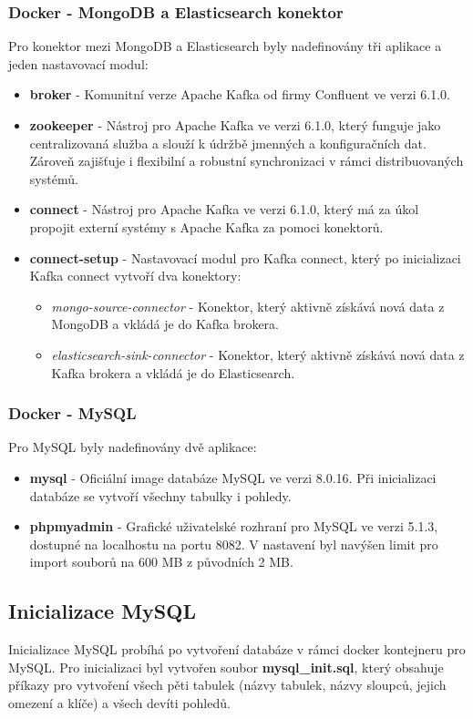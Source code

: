 \subsubsection{Docker - MongoDB a Elasticsearch konektor}
Pro konektor mezi MongoDB a Elasticsearch byly nadefinovány tři aplikace a jeden nastavovací modul:
\begin{itemize}
\item \textbf{broker} - Komunitní verze Apache Kafka od firmy Confluent ve verzi 6.1.0.
\item \textbf{zookeeper} - Nástroj pro Apache Kafka ve verzi 6.1.0, který funguje jako centralizovaná služba a slouží k údržbě jmenných a konfiguračních dat. Zároveň zajišťuje i flexibilní a robustní synchronizaci v rámci distribuovaných systémů.
\item \textbf{connect} - Nástroj pro Apache Kafka ve verzi 6.1.0, který má za úkol propojit externí systémy s Apache Kafka za pomoci konektorů.
\item \textbf{connect-setup} - Nastavovací modul pro Kafka connect, který po inicializaci Kafka connect vytvoří dva konektory:
	\begin{itemize}
	\item \textit{mongo-source-connector} - Konektor, který aktivně získává nová data z MongoDB a vkládá je do Kafka brokera.
	\item \textit{elasticsearch-sink-connector} - Konektor, který aktivně získává nová data z Kafka brokera a vkládá je do Elasticsearch.
	\end{itemize} 
\end{itemize}

\subsubsection{Docker - MySQL}
Pro MySQL byly nadefinovány dvě aplikace:
\begin{itemize}
\item \textbf{mysql} - Oficiální image databáze MySQL ve verzi 8.0.16. Při inicializaci databáze se vytvoří všechny tabulky i pohledy.
\item \textbf{phpmyadmin} - Grafické uživatelské rozhraní pro MySQL ve verzi 5.1.3, dostupné na localhostu na portu 8082. V nastavení byl navýšen limit pro import souborů na 600 MB z původních 2 MB.
\end{itemize}

\subsection{Inicializace MySQL}
Inicializace MySQL probíhá po vytvoření databáze v rámci docker kontejneru pro MySQL. Pro inicializaci byl vytvořen soubor \textbf{mysql\_init.sql}, který obsahuje příkazy pro vytvoření všech pěti tabulek (názvy tabulek, názvy sloupců, jejich omezení a klíče) a všech devíti pohledů.

